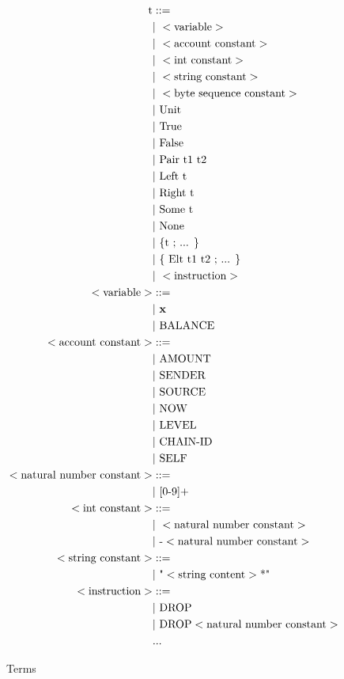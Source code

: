 \documentclass[runningheads]{llncs}
\begin{document}
\begin{figure}
\begin{align*}
\text{t} &::= \\
   &\text{$\mid$}\ < \text{variable} > \\
   &\text{$\mid$}\ < \text{account constant} > \\
   &\text{$\mid$}\ < \text{int constant} > \\
   &\text{$\mid$}\ < \text{string constant} > \\
   &\text{$\mid$}\ < \text{byte sequence constant} > \\
   &\text{$\mid$}\ \text{Unit} \\
   &\text{$\mid$}\ \text{True} \\
   &\text{$\mid$}\ \text{False} \\
   &\text{$\mid$}\ \text{Pair}\ \text{t1 t2}\\
   &\text{$\mid$}\ \text{Left}\ \text{t}\\
   &\text{$\mid$}\ \text{Right}\ \text{t}\\ 
   &\text{$\mid$}\ \text{Some}\ \text{t}\\
   &\text{$\mid$}\ \text{None} \\
   &\text{$\mid$}\ \text{\{t ; ... \}}\\
   &\text{$\mid$}\ \text{\{ Elt t1 t2 ; ... \}}\\
   &\text{$\mid$}\ <\text{instruction}>   \\
< \text{variable} > &::= \\ 
   &\text{$\mid$}\ \textbf{x}\\
   &\text{$\mid$}\ \text{BALANCE} \\
< \text{account constant} > &::= \\ 
   &\text{$\mid$}\ \text{AMOUNT} \\
   &\text{$\mid$}\ \text{SENDER} \\
   &\text{$\mid$}\ \text{SOURCE} \\
   &\text{$\mid$}\ \text{NOW} \\
   &\text{$\mid$}\ \text{LEVEL} \\
   &\text{$\mid$}\ \text{CHAIN-ID} \\
   &\text{$\mid$}\ \text{SELF}  \\
< \text{natural number constant} > &::= \\ 
   &\text{$\mid$}\ \text {[0-9]+} \\
< \text{int constant} > &::= \\
  &\text{$\mid$}\ < \text{natural number constant} > \\
  &\text{$\mid$}\ \text{-} < \text{natural number constant} > \\
<\text{string constant}> &::= \\
  &\text{$\mid$}\ \text{"} < \text{string content}>\text{*"} \\
<\text{instruction}> &::= \\
  &\text{$\mid$}\ \text{DROP} \\
  &\text{$\mid$}\ \text{DROP} <\text{natural number constant}> \\
  &\text{...}
\end{align*}
\caption{Terms}
\label{fig:term}
\end{figure}
\end{document}
